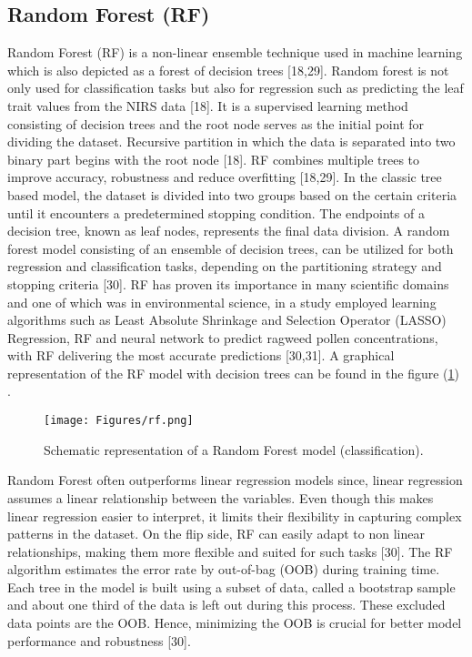 \documentclass[12pt,a4paper]{report}
\begin{document}
\subsection{Random Forest (RF)}
Random Forest (RF) is a non-linear ensemble technique used in machine learning which is also depicted as a forest of decision trees [18,29]. Random forest is not only used for classification tasks but also for regression such as predicting the leaf trait values from the NIRS data [18]. It is a supervised learning method consisting of decision trees and the root node serves as the initial point for dividing the dataset. 
Recursive partition in which the data is separated into two binary part begins with the root node [18]. RF combines multiple trees to improve accuracy, robustness and reduce overfitting [18,29].
In the classic tree based model, the dataset is divided into two groups based on the certain criteria until it encounters a predetermined stopping condition. The endpoints of a decision tree, known as leaf nodes, 
represents the final data division. A random forest model consisting of an ensemble of decision trees, can be utilized for both regression and classification tasks, depending on the partitioning strategy and stopping criteria [30]. 
RF has proven its importance in many scientific domains and one of which was in environmental science, in a study employed learning algorithms such as Least Absolute Shrinkage and Selection Operator (LASSO) Regression, RF and neural network to 
predict ragweed pollen concentrations, with RF delivering the most accurate predictions [30,31]. A graphical representation of the RF model with decision trees can be found in the figure (\ref{fig:rf}) . \\

\begin{figure}[h]
    \centering
    \texttt{[image: Figures/rf.png]}
    \caption{Schematic representation of a Random Forest model (classification).}
    \label{fig:rf}
\end{figure}

Random Forest often outperforms linear regression models since, linear regression assumes a linear relationship between the variables. Even though this makes linear regression easier to interpret, it limits their flexibility in capturing complex patterns in the dataset. 
On the flip side, RF can easily adapt to non linear relationships, making them more flexible and suited for such tasks [30]. The RF algorithm estimates the error rate by out-of-bag (OOB) during training time. Each tree in the model is built using a subset of data, called a 
bootstrap sample and about one third of the data is left out during this process. These excluded data points are the OOB. Hence, minimizing the OOB is crucial for better model performance and robustness [30]. \\
\end{document}
